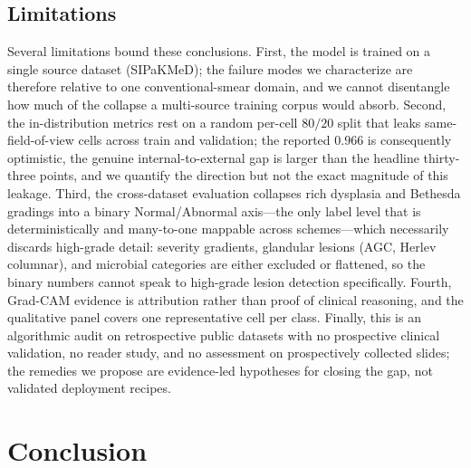 \documentclass[twocolumn]{article}
\begin{document}
\subsection{Limitations}

Several limitations bound these conclusions. First, the model is trained on a single source dataset (SIPaKMeD); the failure modes we characterize are therefore relative to one conventional-smear domain, and we cannot disentangle how much of the collapse a multi-source training corpus would absorb. Second, the in-distribution metrics rest on a random per-cell $80/20$ split that leaks same-field-of-view cells across train and validation; the reported $0.966$ is consequently optimistic, the genuine internal-to-external gap is larger than the headline thirty-three points, and we quantify the direction but not the exact magnitude of this leakage. Third, the cross-dataset evaluation collapses rich dysplasia and Bethesda gradings into a binary Normal/Abnormal axis---the only label level that is deterministically and many-to-one mappable across schemes---which necessarily discards high-grade detail: severity gradients, glandular lesions (AGC, Herlev columnar), and microbial categories are either excluded or flattened, so the binary numbers cannot speak to high-grade lesion detection specifically. Fourth, Grad-CAM evidence is attribution rather than proof of clinical reasoning, and the qualitative panel covers one representative cell per class. Finally, this is an algorithmic audit on retrospective public datasets with no prospective clinical validation, no reader study, and no assessment on prospectively collected slides; the remedies we propose are evidence-led hypotheses for closing the gap, not validated deployment recipes.

\section{Conclusion}
\end{document}
